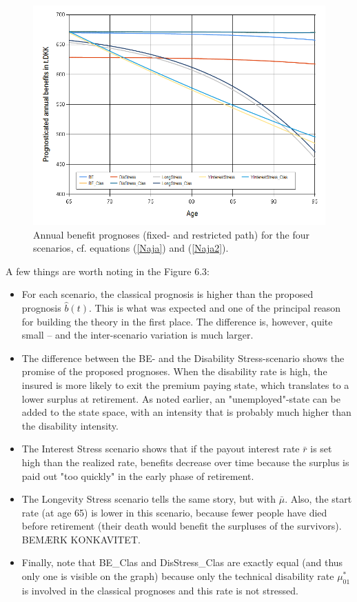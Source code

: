 \documentclass{article}
\newcommand{\1}[1]{\mathbbm{1}_{\left\lbrace #1 \right\rbrace}}
\theoremstyle{break}
\theoremstyle{remark}
\numberwithin{equation}{section}
\begin{document}
\begin{figure}[H] \label{FigureBens}
	\centering
	\caption{Annual benefit prognoses (fixed- and restricted path) for the four scenarios, cf. equations (\ref{Naja}) and (\ref{Naja2}).}
	\includegraphics[width=\textwidth]{Benefits}
\end{figure}

A few things are worth noting in the Figure 6.3:

\begin{itemize}
	\item For each scenario, the classical prognosis is higher than the proposed prognosis $\hat{b}(t)$. This is what was expected and one of the principal reason for building the theory in the first place. The difference is, however, quite small -- and the inter-scenario variation is much larger.
	\item The difference between the BE- and the Disability Stress-scenario shows the promise of the proposed prognoses. When the disability rate is high, the insured is more likely to exit the premium paying state, which translates to a lower surplus at retirement. As noted earlier, an "unemployed"-state can be added to the state space, with an intensity that is probably much higher than the disability intensity.
	\item The Interest Stress scenario shows that if the payout interest rate $\bar{r}$ is set high than the realized rate, benefits decrease over time because the surplus is paid out "too quickly" in the early phase of retirement.
	\item The Longevity Stress scenario tells the same story, but with $\bar{\mu}$. Also, the start rate (at age 65) is lower in this scenario, because fewer people have died before retirement (their death would benefit the surpluses of the survivors). BEMÆRK KONKAVITET.
	\item Finally, note that BE\_Clas and DisStress\_Clas are exactly equal (and thus only one is visible on the graph) because only the technical disability rate $\mu_{01}^*$ is involved in the classical prognoses and this rate is not stressed.
\end{itemize}
\end{document}
